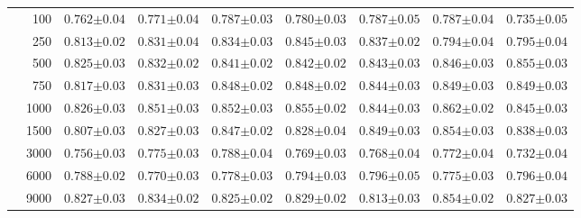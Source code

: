 \begin{table}[p]
\begin{tabularx}{\textwidth}{cr| *{7}{Y}}
        & 100 & $0.762{\scriptscriptstyle\pm0.04}$ & $0.771{\scriptscriptstyle\pm0.04}$ & $0.787{\scriptscriptstyle\pm0.03}$ & $0.780{\scriptscriptstyle\pm0.03}$ & $0.787{\scriptscriptstyle\pm0.05}$ & $0.787{\scriptscriptstyle\pm0.04}$ & $0.735{\scriptscriptstyle\pm0.05}$ \\
        & 250 & $0.813{\scriptscriptstyle\pm0.02}$ & $0.831{\scriptscriptstyle\pm0.04}$ & $0.834{\scriptscriptstyle\pm0.03}$ & $0.845{\scriptscriptstyle\pm0.03}$ & $0.837{\scriptscriptstyle\pm0.02}$ & $0.794{\scriptscriptstyle\pm0.04}$ & $0.795{\scriptscriptstyle\pm0.04}$ \\
        & 500 & $0.825{\scriptscriptstyle\pm0.03}$ & $0.832{\scriptscriptstyle\pm0.02}$ & $0.841{\scriptscriptstyle\pm0.02}$ & $0.842{\scriptscriptstyle\pm0.02}$ & $0.843{\scriptscriptstyle\pm0.03}$ & $0.846{\scriptscriptstyle\pm0.03}$ & $0.855{\scriptscriptstyle\pm0.03}$ \\
        & 750 & $0.817{\scriptscriptstyle\pm0.03}$ & $0.831{\scriptscriptstyle\pm0.03}$ & $0.848{\scriptscriptstyle\pm0.02}$ & $0.848{\scriptscriptstyle\pm0.02}$ & $0.844{\scriptscriptstyle\pm0.03}$ & $0.849{\scriptscriptstyle\pm0.03}$ & $0.849{\scriptscriptstyle\pm0.03}$ \\
        & 1000 & $0.826{\scriptscriptstyle\pm0.03}$ & $0.851{\scriptscriptstyle\pm0.03}$ & $0.852{\scriptscriptstyle\pm0.03}$ & $0.855{\scriptscriptstyle\pm0.02}$ & $0.844{\scriptscriptstyle\pm0.03}$ & $0.862{\scriptscriptstyle\pm0.02}$ & $0.845{\scriptscriptstyle\pm0.03}$ \\
        & 1500 & $0.807{\scriptscriptstyle\pm0.03}$ & $0.827{\scriptscriptstyle\pm0.03}$ & $0.847{\scriptscriptstyle\pm0.02}$ & $0.828{\scriptscriptstyle\pm0.04}$ & $0.849{\scriptscriptstyle\pm0.03}$ & $0.854{\scriptscriptstyle\pm0.03}$ & $0.838{\scriptscriptstyle\pm0.03}$ \\
        & 3000 & $0.756{\scriptscriptstyle\pm0.03}$ & $0.775{\scriptscriptstyle\pm0.03}$ & $0.788{\scriptscriptstyle\pm0.04}$ & $0.769{\scriptscriptstyle\pm0.03}$ & $0.768{\scriptscriptstyle\pm0.04}$ & $0.772{\scriptscriptstyle\pm0.04}$ & $0.732{\scriptscriptstyle\pm0.04}$ \\
        & 6000 & $0.788{\scriptscriptstyle\pm0.02}$ & $0.770{\scriptscriptstyle\pm0.03}$ & $0.778{\scriptscriptstyle\pm0.03}$ & $0.794{\scriptscriptstyle\pm0.03}$ & $0.796{\scriptscriptstyle\pm0.05}$ & $0.775{\scriptscriptstyle\pm0.03}$ & $0.796{\scriptscriptstyle\pm0.04}$ \\
        & 9000 & $0.827{\scriptscriptstyle\pm0.03}$ & $0.834{\scriptscriptstyle\pm0.02}$ & $0.825{\scriptscriptstyle\pm0.02}$ & $0.829{\scriptscriptstyle\pm0.02}$ & $0.813{\scriptscriptstyle\pm0.03}$ & $0.854{\scriptscriptstyle\pm0.02}$ & $0.827{\scriptscriptstyle\pm0.03}$ \\

\end{tabularx}
\end{table}
